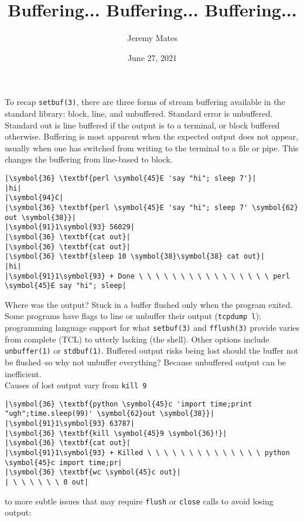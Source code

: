 \documentclass[10pt,a4paper]{article}
\title{Buffering... Buffering... Buffering...}
\author{Jeremy Mates}
\date{June 27, 2021}
\begin{document}
\maketitle

To recap \texttt{setbuf(3)}, there are three forms of stream buffering
available in the standard library: block, line, and unbuffered. Standard
error is unbuffered. Standard out is line buffered if the output is to a
terminal, or block buffered otherwise. Buffering is most apparent when
the expected output does not appear, usually when one has switched from
writing to the terminal to a file or pipe. This changes the buffering
from line-based to block.

\begin{lstlisting}
|\symbol{36} \textbf{perl \symbol{45}E 'say "hi"; sleep 7'}|
|hi|
|\symbol{94}C|
|\symbol{36} \textbf{perl \symbol{45}E 'say "hi"; sleep 7' \symbol{62} out \symbol{38}}|
|\symbol{91}1\symbol{93} 56029|
|\symbol{36} \textbf{cat out}|
|\symbol{36} \textbf{cat out}|
|\symbol{36} \textbf{sleep 10 \symbol{38}\symbol{38} cat out}|
|hi|
|\symbol{91}1\symbol{93} + Done \ \ \ \ \ \ \ \ \ \ \ \ \ \ \ \ perl \symbol{45}E say "hi"; sleep|
\end{lstlisting}

Where was the output? Stuck in a buffer flushed only when the program
exited. Some programs have flags to line or unbuffer their output
(\texttt{tcpdump l}); programming language support for what
\texttt{setbuf(3)} and \texttt{fflush(3)} provide varies from complete
(TCL) to utterly lacking (the shell). Other options include
\texttt{unbuffer(1)} or \texttt{stdbuf(1)}. Buffered output risks being
lost should the buffer not be flushed--so why not unbuffer everything?
Because unbuffered output can be inefficient. \\

Causes of lost output vary from \texttt{kill 9}

\begin{lstlisting}
|\symbol{36} \textbf{python \symbol{45}c 'import time;print "ugh";time.sleep(99)' \symbol{62}out \symbol{38}}|
|\symbol{91}1\symbol{93} 63787|
|\symbol{36} \textbf{kill \symbol{45}9 \symbol{36}!}|
|\symbol{36} \textbf{cat out}|
|\symbol{91}1\symbol{93} + Killed \ \ \ \ \ \ \ \ \ \ \ \ \ \ python \symbol{45}c import time;pr|
|\symbol{36} \textbf{wc \symbol{45}c out}|
| \ \ \ \ \ \ 0 out|
\end{lstlisting}

to more subtle issues that may require \texttt{flush} or \texttt{close}
calls to avoid losing output:
\end{document}
